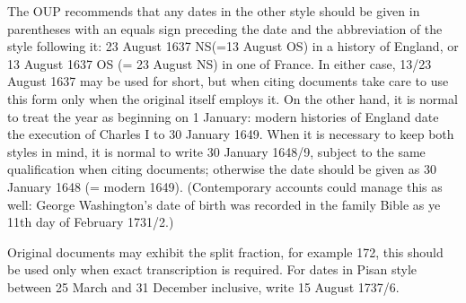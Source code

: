 The OUP recommends that any dates
in the other style should be given in parentheses with an equals sign
preceding the date and the abbreviation of the style following it: 23
August 1637 NS(=13 August OS) in a history of England, or 13 August 1637
OS (= 23 August NS) in one of France. In either case, 13/23 August 1637 may
be used for short, but when citing documents take care to use this form
only when the original itself employs it. On the other hand, it is normal
to treat the year as beginning on 1 January: modern histories of England
date the execution of Charles I to 30 January 1649. When it is necessary to
keep both styles in mind, it is normal to write 30 January 1648/9, subject to
the same qualification when citing documents; otherwise the date
should be given as 30 January 1648 (= modern 1649). (Contemporary accounts
could manage this as well: George Washington's date of birth was
recorded in the family Bible as ye 11th day of February 1731/2.) 

Original
documents may exhibit the split fraction, for example 172, this should
be used only when exact transcription is required. For dates in Pisan style
between 25 March and 31 December inclusive, write 15 August 1737/6. 









